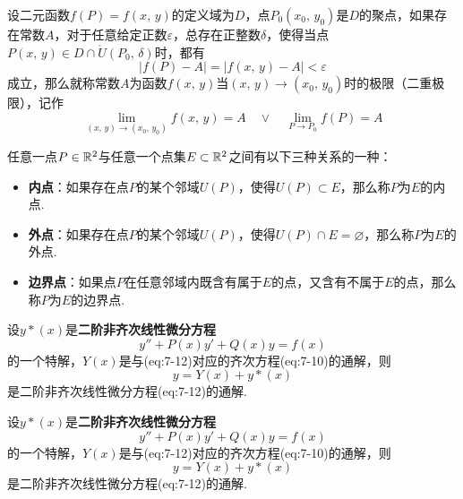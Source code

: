 \documentclass[12pt, a4paper, oneside, UTF8]{ctexbook}  %
\begin{document}
\begin{defn}
    设二元函数$f(P) = f(x,\,y)$的定义域为$D$，点$P_0(x_0,\,y_0)$是$D$的聚点，如果存在常数$A$，对于任意给定正数$\varepsilon$，总存在正整数$\delta$，使得当点$P(x,\,y) \in D \cap \mathring{U}(P_0,\,\delta)$时，都有
    \[
        |f(P)-A| = |f(x,\,y) - A| < \varepsilon
    \]
    成立，那么就称常数$A$为函数$f(x,\,y)$当$(x,\,y) \to (x_0,\,y_0)$时的极限（二重极限），记作
    \[
        \lim_{(x,\,y) \to (x_0,\,y_0)}f(x,\,y) = A \quad \lor \quad \lim_{P \to P_0}f(P) = A
    \]
\end{defn}


任意一点$P \in \mathbb{R}^2$与任意一个点集$E \subset \mathbb{R}^2$之间有以下三种关系的一种：
\begin{itemize}[leftmargin=45pt]
    \item \textbf{内点}：如果存在点$P$的某个邻域$U(P)$，使得$U(P) \subset E$，那么称$P$为$E$的内点.
    \item \textbf{外点}：如果存在点$P$的某个邻域$U(P)$，使得$U(P) \cap E = \varnothing$，那么称$P$为$E$的外点.
    \item \textbf{边界点}：如果点$P$在任意邻域内既含有属于$E$的点，又含有不属于$E$的点，那么称$P$为$E$的边界点.
\end{itemize}


\begin{defn}[线性微分方程解的结构]
    设$y*(x)$是\textbf{二阶非齐次线性微分方程}
    \begin{equation}
        y'' + P(x)y'+Q(x)y = f(x)
    \end{equation}
    的一个特解，$Y(x)$是与(eq:7-12)对应的齐次方程(eq:7-10)的通解，则
    \begin{equation}
        y = Y(x)+y*(x)
    \end{equation}
    是二阶非齐次线性微分方程(eq:7-12)的通解.
\end{defn}

\begin{thm}[线性微分方程解的结构]
    设$y*(x)$是\textbf{二阶非齐次线性微分方程}
    \begin{equation}
        y'' + P(x)y'+Q(x)y = f(x)
    \end{equation}
    的一个特解，$Y(x)$是与(eq:7-12)对应的齐次方程(eq:7-10)的通解，则
    \begin{equation}
        y = Y(x)+y*(x)
    \end{equation}
    是二阶非齐次线性微分方程(eq:7-12)的通解.
\end{thm}
\end{document}
